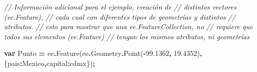 \documentclass[
  12pt,
  letterpaper,
  twoside]{book}
\newenvironment{Shaded}{\begin{snugshade}}{\end{snugshade}}
\newcommand{\AttributeTok}[1]{\textcolor[rgb]{0.77,0.63,0.00}{#1}}
\newcommand{\CommentTok}[1]{\textcolor[rgb]{0.56,0.35,0.01}{\textit{#1}}}
\newcommand{\DataTypeTok}[1]{\textcolor[rgb]{0.13,0.29,0.53}{#1}}
\newcommand{\FloatTok}[1]{\textcolor[rgb]{0.00,0.00,0.81}{#1}}
\newcommand{\FunctionTok}[1]{\textcolor[rgb]{0.00,0.00,0.00}{#1}}
\newcommand{\KeywordTok}[1]{\textcolor[rgb]{0.13,0.29,0.53}{\textbf{#1}}}
\newcommand{\NormalTok}[1]{#1}
\newcommand{\OperatorTok}[1]{\textcolor[rgb]{0.81,0.36,0.00}{\textbf{#1}}}
\newcommand{\StringTok}[1]{\textcolor[rgb]{0.31,0.60,0.02}{#1}}
\begin{document}
\begin{Shaded}
\begin{Highlighting}[]
\CommentTok{//  Información adicional para el ejemplo, creación de }
\CommentTok{// distintos vectores (ee.Feature),}
\CommentTok{//  cada cual con diferentes tipos de geometrías y distintos}
\CommentTok{// atributos.}
\CommentTok{//  esto para mostrar que una ee.FeatureCollection, no }
\CommentTok{// requiere que todos sus elementos (ee.Feature)}
\CommentTok{//  tengan los mismos atributos, ni geometrías}


\KeywordTok{var}\NormalTok{ Punto }\OperatorTok{=}\NormalTok{ ee}\OperatorTok{.}\FunctionTok{Feature}\NormalTok{(ee}\OperatorTok{.}\AttributeTok{Geometry}\OperatorTok{.}\FunctionTok{Point}\NormalTok{(}\OperatorTok{{-}}\FloatTok{99.1362}\OperatorTok{,} \FloatTok{19.4352}\NormalTok{)}\OperatorTok{,}
\NormalTok{    \{}\DataTypeTok{pais}\OperatorTok{:}\StringTok{\textquotesingle{}Mexico\textquotesingle{}}\OperatorTok{,}\DataTypeTok{capital}\OperatorTok{:}\StringTok{\textquotesingle{}cdmx\textquotesingle{}}\NormalTok{\})}\OperatorTok{;}


\end{Highlighting}
\end{Shaded}
\end{document}
